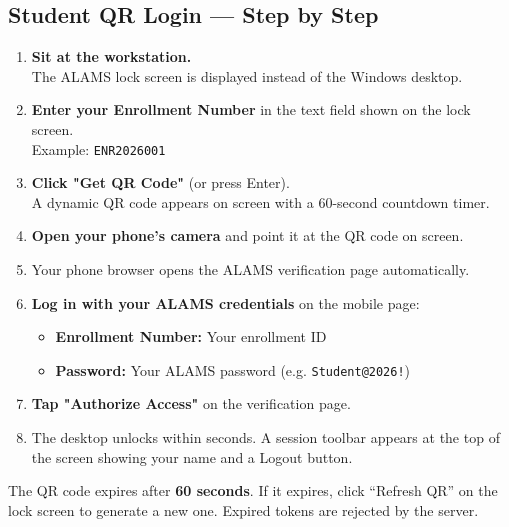 \subsection{Student QR Login — Step by Step}

\begin{enumerate}[leftmargin=*, label=\textbf{Step \arabic*.}]

\item \textbf{Sit at the workstation.}\\
The ALAMS lock screen is displayed instead of the Windows desktop.

\item \textbf{Enter your Enrollment Number} in the text field shown on the lock screen.\\
Example: \texttt{ENR2026001}

\item \textbf{Click "Get QR Code"} (or press Enter).\\
A dynamic QR code appears on screen with a 60-second countdown timer.

\item \textbf{Open your phone's camera} and point it at the QR code on screen.

\item Your phone browser opens the ALAMS verification page automatically.

\item \textbf{Log in with your ALAMS credentials} on the mobile page:
\begin{itemize}
  \item \textbf{Enrollment Number:} Your enrollment ID
  \item \textbf{Password:} Your ALAMS password (e.g. \texttt{Student@2026!})
\end{itemize}

\item \textbf{Tap "Authorize Access"} on the verification page.

\item The desktop unlocks within seconds. A session toolbar appears at the top of the screen showing your name and a Logout button.

\end{enumerate}

\begin{tcolorbox}[warningbox, title={\faExclamationTriangle\quad QR Code Expiry}]
The QR code expires after \textbf{60 seconds}. If it expires, click ``Refresh QR'' on the lock screen to generate a new one. Expired tokens are rejected by the server.
\end{tcolorbox}

